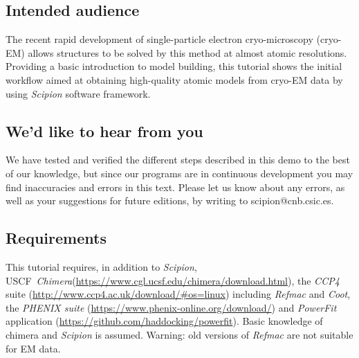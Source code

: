 \documentclass[12pt]{article} %
\def\ccp4{\textit{CCP4}\xspace}
\def\chimera{\textit{Chimera}\xspace}
\def\coot{\textit{Coot}\xspace}
\def\powerfit{\textit{PowerFit}\xspace}
\def\refmac{\textit{Refmac}\xspace}
\def\scipion{\textit{Scipion}\xspace}
\begin{document}


\subsection*{Intended audience}
The recent rapid development of single-particle electron cryo-microscopy (cryo-EM) allows structures to be solved by this method at almost atomic resolutions.  Providing a basic introduction to model building, this tutorial shows the initial workflow aimed at obtaining high-quality atomic models from cryo-EM data by using \scipion software framework. %


\subsection*{We'd like to hear from you}

We have tested and verified the different steps described in this demo
to the best of our knowledge, but since our programs are in continuous
development you may find inaccuracies and errors in this text. Please
let us know about any errors, as well as your suggestions for
future editions, by writing to
scipion@cnb.csic.es.


\subsection*{Requirements}

This tutorial requires, in addition to \scipion, USCF~\chimera (\url{https://www.cgl.ucsf.edu/chimera/download.html}), the \ccp4 suite (\url{http://www.ccp4.ac.uk/download/#os=linux}) including \refmac and \coot, the \textit{PHENIX suite} (\url{https://www.phenix-online.org/download/}) and \powerfit application (\url{https://github.com/haddocking/powerfit}). Basic knowledge of chimera and \scipion is assumed. Warning: old versions of \refmac are not suitable for EM data.

\newpage


\end{document}
